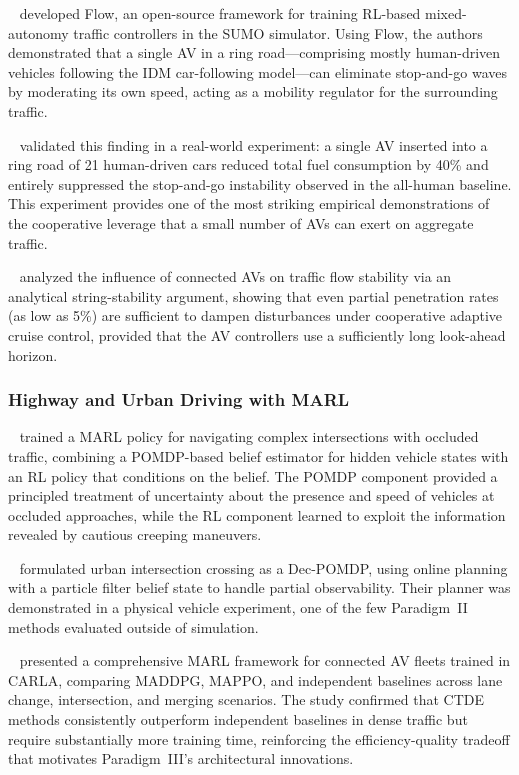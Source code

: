 \documentclass[12pt, a4paper]{article}
\begin{document}
\citeauthor{wu2017flow}~\cite{wu2017flow} developed Flow, an open-source
framework for training RL-based mixed-autonomy traffic controllers in the SUMO
simulator.  Using Flow, the authors demonstrated that a single AV in a ring
road---comprising mostly human-driven vehicles following the IDM car-following
model---can eliminate stop-and-go waves by moderating its own speed, acting
as a mobility regulator for the surrounding traffic.

\citeauthor{stern2018dissipation}~\cite{stern2018dissipation} validated this
finding in a real-world experiment: a single AV inserted into a ring road of
21 human-driven cars reduced total fuel consumption by 40\% and entirely
suppressed the stop-and-go instability observed in the all-human baseline.
This experiment provides one of the most striking empirical demonstrations of
the cooperative leverage that a small number of AVs can exert on aggregate
traffic.

\citeauthor{talebpour2016influence}~\cite{talebpour2016influence} analyzed the
influence of connected AVs on traffic flow stability via an analytical
string-stability argument, showing that even partial penetration rates (as low
as 5\%) are sufficient to dampen disturbances under cooperative adaptive
cruise control, provided that the AV controllers use a sufficiently long
look-ahead horizon.

\subsubsection{Highway and Urban Driving with MARL}

\citeauthor{isele2018navigating}~\cite{isele2018navigating} trained a
MARL policy for navigating complex intersections with occluded traffic,
combining a POMDP-based belief estimator for hidden vehicle states with an
RL policy that conditions on the belief.  The POMDP component provided a
principled treatment of uncertainty about the presence and speed of vehicles
at occluded approaches, while the RL component learned to exploit the
information revealed by cautious creeping maneuvers.

\citeauthor{hubmann2018automated}~\cite{hubmann2018automated} formulated
urban intersection crossing as a Dec-POMDP, using online planning with a
particle filter belief state to handle partial observability.  Their planner
was demonstrated in a physical vehicle experiment, one of the few Paradigm~II
methods evaluated outside of simulation.

\citeauthor{palanisamy2020multi}~\cite{palanisamy2020multi} presented
a comprehensive MARL framework for connected AV fleets trained in CARLA,
comparing MADDPG, MAPPO, and independent baselines across lane change,
intersection, and merging scenarios.  The study confirmed that CTDE methods
consistently outperform independent baselines in dense traffic but require
substantially more training time, reinforcing the efficiency-quality tradeoff
that motivates Paradigm~III's architectural innovations.
\end{document}
